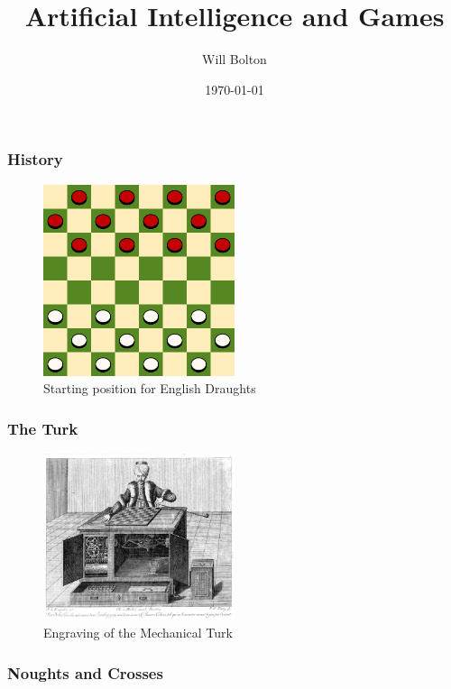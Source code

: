 \documentclass{beamer}
\title[Artificial Intelligence and Games]{Artificial Intelligence and Games}
\author{Will Bolton}
\date{\today}
\begin{document}
\titlepage %

\begin{frame} %
\frametitle{History}
\begin{figure}
	\centering
	\includegraphics[width=0.5\textwidth]{images/draughts.png}
	\caption{Starting position for English Draughts}
	\label{draughts}
\end{figure}
\end{frame}

\begin{frame} %
\frametitle{The Turk}
\begin{figure}
	\centering
	\includegraphics[width=0.5\textwidth]{images/turk.jpg}
	\caption{Engraving of the Mechanical Turk}
	\label{turk}
\end{figure}
\end{frame}

\begin{frame} %
\frametitle{Noughts and Crosses}
\begin{figure}
	\centering
\end{figure}
\end{frame}
\end{document}
